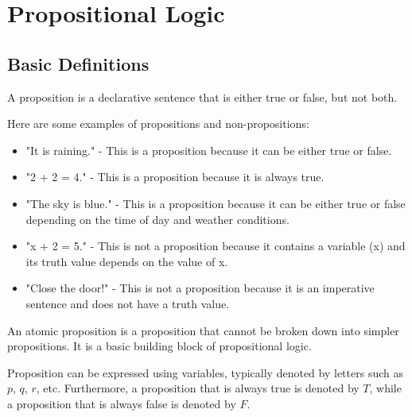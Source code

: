 \chapter{Propositional Logic}

\section{Basic Definitions}
\begin{definition}[Proposition]
    A proposition is a declarative sentence that is either true or false, but not both.
\end{definition}

\begin{eg}
    Here are some examples of propositions and non-propositions:
    \begin{itemize}[itemsep=1pt,label=$\circ$]
        \item "It is raining." - This is a proposition because it can be either true or false.
        \item "2 + 2 = 4." - This is a proposition because it is always true.
        \item "The sky is blue." - This is a proposition because it can be either true or false depending on the time of day and weather conditions.
        \item "x + 2 = 5." - This is not a proposition because it contains a variable (x) and its truth value depends on the value of x.
        \item "Close the door!" - This is not a proposition because it is an imperative sentence and does not have a truth value.
    \end{itemize}
\end{eg}

\begin{definition}
    An atomic proposition is a proposition that cannot be broken down into simpler propositions. It is a basic building block of propositional logic.
\end{definition}
Proposition can be expressed using variables, typically denoted by letters such as \(p\), \(q\), \(r\), etc. Furthermore, a proposition that is always true is denoted by $T$, while a proposition that is always false is denoted by $F$.

